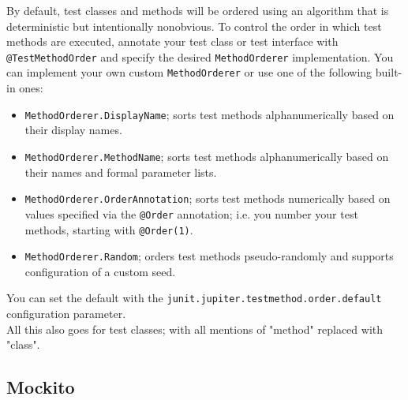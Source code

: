 \documentclass[8pt, table, xcdraw]{article}%
\begin{document}
By default, test classes and methods will be ordered using an algorithm that is deterministic but intentionally nonobvious. To control the order in which test methods are executed, annotate your test class or test interface with \lstinline{@TestMethodOrder} and specify the desired \lstinline{MethodOrderer} implementation. You can implement your own custom \lstinline{MethodOrderer} or use one of the following built-in ones:

\begin{itemize}
    \item \lstinline{MethodOrderer.DisplayName}; sorts test methods alphanumerically based on their display names.
    \item \lstinline{MethodOrderer.MethodName}; sorts test methods alphanumerically based on their names and formal parameter lists.
    \item \lstinline{MethodOrderer.OrderAnnotation}; sorts test methods numerically based on values specified via the \lstinline{@Order} annotation; i.e. you number your test methods, starting with \lstinline{@Order(1)}.
    \item \lstinline{MethodOrderer.Random}; orders test methods pseudo-randomly and supports configuration of a custom seed.
\end{itemize}

You can set the default with the \lstinline{junit.jupiter.testmethod.order.default} configuration parameter.\\
All this also goes for test classes; with all mentions of "method" replaced with "class".


\subsection{Mockito}
\end{document}
